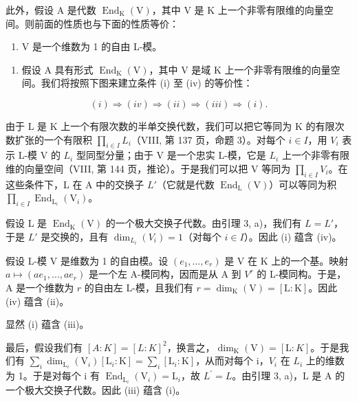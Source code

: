 此外，假设 A 是代数 \(\operatorname{End}_{\mathrm{K}}(\mathrm{V})\)，其中 V 是 K 上一个非零有限维的向量空间。则前面的性质也与下面的性质等价：

\begin{enumerate}
\def\labelenumi{(\roman{enumi})}
\setcounter{enumi}{3}
\tightlist
\item
  V 是一个维数为 1 的自由 L-模。
\end{enumerate}

\begin{enumerate}
\def\labelenumi{\Alph{enumi})}
\tightlist
\item
  假设 A 具有形式 \(\operatorname{End}_{\mathrm{K}}(\mathrm{V})\)，其中 V 是域 K 上一个非零有限维的向量空间。我们将按照下图来建立条件 (i) 至 (iv) 的等价性：
\end{enumerate}

\[
(i) \Longrightarrow (i v) \Longrightarrow (i i) \Longrightarrow (i i i) \Longrightarrow (i).
\]

由于 L 是 K 上一个有限次数的半单交换代数，我们可以把它等同为 K 的有限次数扩张的一个有限积 \(\prod_{i\in I}L_{i}\)（VIII, 第 137 页，命题 3）。对每个 \(i\in I\)，用 \(V_{i}\) 表示 L-模 V 的 \(L_{i}\) 型同型分量；由于 V 是一个忠实 L-模，它是 \(L_{i}\) 上一个非零有限维的向量空间（VIII, 第 144 页，推论）。于是我们可以把 V 等同为 \(\prod_{i\in I}V_{i}\)。在这些条件下，L 在 A 中的交换子 \(L'\)（它就是代数 \(\operatorname{End}_{\mathrm{L}}(\mathrm{V})\)）可以等同为积 \(\prod_{i\in I}\operatorname{End}_{\mathrm{L}_{i}}(\mathrm{V}_{i})\)。

假设 L 是 \(\operatorname{End}_{\mathrm{K}}(\mathrm{V})\) 的一个极大交换子代数。由引理 3, a)，我们有 \(L = L'\)，于是 \(L'\) 是交换的，且有 \(\dim_{L_i}(V_i) = 1\)（对每个 \(i \in I\)）。因此 (i) 蕴含 (iv)。

假设 L-模 V 是维数为 1 的自由模。设 \((e_{1},\ldots,e_{r})\) 是 V 在 K 上的一个基。映射 \(a\mapsto(ae_{1},\ldots,ae_{r})\) 是一个左 A-模同构，因而是从 A 到 \(V^{r}\) 的 L-模同构。于是，A 是一个维数为 \(r\) 的自由左 L-模，且我们有 \(r = \dim_{\mathrm{K}}(\mathrm{V}) = [\mathrm{L}:\mathrm{K}]\)。因此 (iv) 蕴含 (ii)。

显然 (i) 蕴含 (iii)。

最后，假设我们有 \([A:K]=[L:K]^{2}\)，换言之，\(\dim_{\mathrm{K}}(\mathrm{V})=[\mathrm{L}:K]\)。于是我们有 \(\sum_{i}\dim_{\mathrm{L}_{i}}(\mathrm{V}_{i})[\mathrm{L}_{i}:\mathrm{K}]=\sum_{i}[\mathrm{L}_{i}:\mathrm{K}]\)，从而对每个 i，\(V_{i}\) 在 \(L_{i}\) 上的维数为 1。于是对每个 i 有 \(\operatorname{End}_{\mathrm{L}_{i}}(\mathrm{V}_{i})=\mathrm{L}_{i}\)，故 \(L^{\prime}=L\)。由引理 3, a)，L 是 A 的一个极大交换子代数。因此 (iii) 蕴含 (i)。

